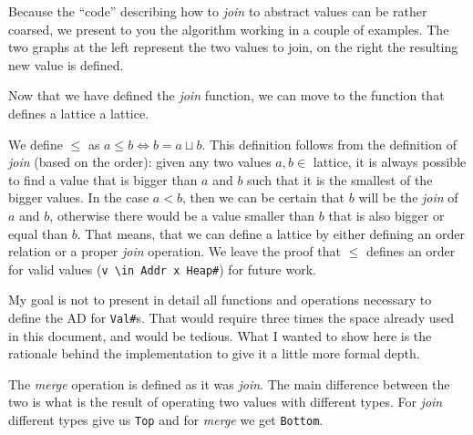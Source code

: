 Because the \enquote{code} describing how to \emph{join} to abstract
values can be rather coarsed, we present to you the algorithm working in
a couple of examples. The two graphs at the left represent the two
values to join, on the right the resulting new value is defined.

{}

{}

{}

Now that we have defined the \emph{join} function, we can move to the
function that defines a lattice a lattice.

We define \(\le{}\) as \(a \le b \iff b = a \sqcup b\). This definition
follows from the definition of \emph{join} (based on the order): given
any two values \(a,b \in\) lattice, it is always possible to find a
value that is bigger than \(a\) and \(b\) such that it is the smallest
of the bigger values. In the case \(a < b\), then we can be certain that
\(b\) will be the \emph{join} of \(a\) and \(b\), otherwise there would
be a value smaller than \(b\) that is also bigger or equal than \(b\).
That means, that we can define a lattice by either defining an order
relation or a proper \emph{join} operation. We leave the proof that
\(\le{}\) defines an order for valid values
(\texttt{v\ \textbackslash{}in\ Addr\ x\ Heap\#}) for future work.

{}

My goal is not to present in detail all functions and operations
necessary to define the AD for \texttt{Val\#}s. That would require three
times the space already used in this document, and would be tedious.
What I wanted to show here is the rationale behind the implementation to
give it a little more formal depth.

The \emph{merge} operation is defined as it was \emph{join}. The main
difference between the two is what is the result of operating two values
with different types. For \emph{join} different types give us
\texttt{Top} and for \emph{merge} we get \texttt{Bottom}.

